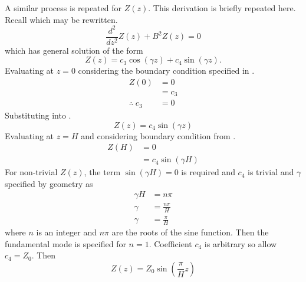  A similar process is repeated for $Z(z)$. This derivation is briefly repeated 
  here. Recall  which may be rewritten.
  \begin{equation}
    \frac{d^2}{dz^2} Z(z) + B^2 Z(z) = 0
  \end{equation}
  which has general solution of the form
  \begin{equation}
    \label{eq:finite_cyl_z_general}
    Z(z) = c_3 \cos(\gamma z) + c_4 \sin(\gamma z).
  \end{equation}
  Evaluating  at $z=0$ considering the boundary
  condition specified in .
  \begin{align}
    Z(0) &= 0 \\
    &= c_3 \\
    \label{eq:finite_cyl_c3}
    \therefore \; c_3 &= 0
  \end{align}
  Substituting  into .
  \begin{equation}
    \label{eq:finite_cyl_z_sin}
    Z(z) = c_4 \sin(\gamma z)
  \end{equation}
  Evaluating  at $z=H$ and considering boundary
  condition from .
  \begin{align}
    Z(H) &= 0 \\
    &= c_4 \sin(\gamma H)
  \end{align}
  For non-trivial $Z(z)$, the term $\sin(\gamma H)=0$ is required and $c_4$ is
  trivial and $\gamma$ specified by geometry as
  \begin{align}
    \gamma H &= n \pi \\
    \gamma &= \frac{n \pi}{H} \\
    \label{eq:finite_cyl_gamma}
    \gamma &= \frac{\pi}{H}
  \end{align}
  where $n$ is an integer and $n \pi$ are the roots of the sine function.
  Then the fundamental mode is specified for $n=1$. Coefficient $c_4$ is
  arbitrary so allow $c_4 = Z_0$. Then
  \begin{equation}
    \label{eq:finite_cyl_Z}
    Z(z) = Z_0 \sin\left(\frac{\pi}{H} z\right)
  \end{equation}

